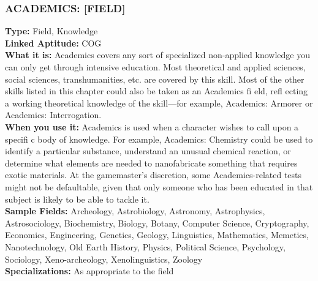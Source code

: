 \subsubsection{ACADEMICS: [FIELD]}
\textbf{Type:} Field, Knowledge
\\ \textbf{Linked Aptitude:} COG
\\ \textbf{What it is:}
Academics covers any sort of specialized
non-applied knowledge you can only get
through intensive education. Most theoretical and
applied sciences, social sciences, transhumanities,
etc. are covered by this skill. Most of the other
skills listed in this chapter could also be taken as
an Academics fi eld, refl ecting a working theoretical
knowledge of the skill—for example, Academics:
Armorer or Academics: Interrogation.
\\ \textbf{When you use it:} Academics is used when a
character wishes to call upon a specifi c body of
knowledge. For example, Academics: Chemistry
could be used to identify a particular substance,
understand an unusual chemical reaction, or determine
what elements are needed to nanofabricate
something that requires exotic materials. At the
gamemaster’s discretion, some Academics-related
tests might not be defaultable, given that only
someone who has been educated in that subject is
likely to be able to tackle it.
\\ \textbf{Sample Fields:} Archeology, Astrobiology, Astronomy,
Astrophysics, Astrosociology, Biochemistry,
Biology, Botany, Computer Science,
Cryptography, Economics, Engineering, Genetics,
Geology, Linguistics, Mathematics, Memetics,
Nanotechnology, Old Earth History, Physics, Political Science, Psychology, Sociology, Xeno-archeology,
Xenolinguistics, Zoology
\\ \textbf{Specializations:} As appropriate to the field

